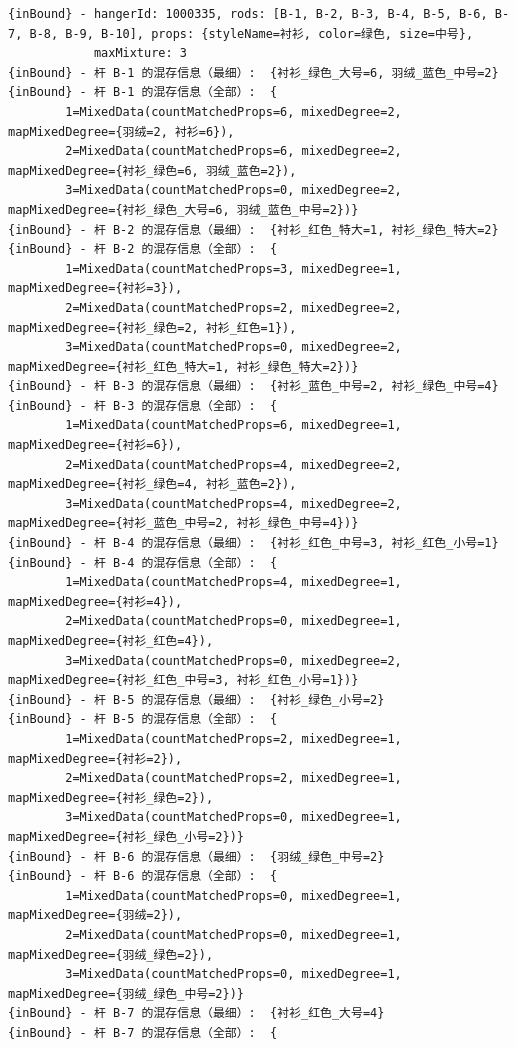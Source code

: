 \begin{enumerate}[leftmargin=32pt,label=\bf{增强\Roman*.}]
\begin{itemize}
		{\scriptsize
		\begin{verbatim}
{inBound} - hangerId: 1000335, rods: [B-1, B-2, B-3, B-4, B-5, B-6, B-7, B-8, B-9, B-10], props: {styleName=衬衫, color=绿色, size=中号}, 
            maxMixture: 3
{inBound} - 杆 B-1 的混存信息（最细）:  {衬衫_绿色_大号=6, 羽绒_蓝色_中号=2}
{inBound} - 杆 B-1 的混存信息（全部）:  {
		1=MixedData(countMatchedProps=6, mixedDegree=2, mapMixedDegree={羽绒=2, 衬衫=6}), 
		2=MixedData(countMatchedProps=6, mixedDegree=2, mapMixedDegree={衬衫_绿色=6, 羽绒_蓝色=2}), 
		3=MixedData(countMatchedProps=0, mixedDegree=2, mapMixedDegree={衬衫_绿色_大号=6, 羽绒_蓝色_中号=2})}
{inBound} - 杆 B-2 的混存信息（最细）:  {衬衫_红色_特大=1, 衬衫_绿色_特大=2}
{inBound} - 杆 B-2 的混存信息（全部）:  {
		1=MixedData(countMatchedProps=3, mixedDegree=1, mapMixedDegree={衬衫=3}), 
		2=MixedData(countMatchedProps=2, mixedDegree=2, mapMixedDegree={衬衫_绿色=2, 衬衫_红色=1}), 
		3=MixedData(countMatchedProps=0, mixedDegree=2, mapMixedDegree={衬衫_红色_特大=1, 衬衫_绿色_特大=2})}
{inBound} - 杆 B-3 的混存信息（最细）:  {衬衫_蓝色_中号=2, 衬衫_绿色_中号=4}
{inBound} - 杆 B-3 的混存信息（全部）:  {
		1=MixedData(countMatchedProps=6, mixedDegree=1, mapMixedDegree={衬衫=6}), 
		2=MixedData(countMatchedProps=4, mixedDegree=2, mapMixedDegree={衬衫_绿色=4, 衬衫_蓝色=2}), 
		3=MixedData(countMatchedProps=4, mixedDegree=2, mapMixedDegree={衬衫_蓝色_中号=2, 衬衫_绿色_中号=4})}
{inBound} - 杆 B-4 的混存信息（最细）:  {衬衫_红色_中号=3, 衬衫_红色_小号=1}
{inBound} - 杆 B-4 的混存信息（全部）:  {
		1=MixedData(countMatchedProps=4, mixedDegree=1, mapMixedDegree={衬衫=4}), 
		2=MixedData(countMatchedProps=0, mixedDegree=1, mapMixedDegree={衬衫_红色=4}), 
		3=MixedData(countMatchedProps=0, mixedDegree=2, mapMixedDegree={衬衫_红色_中号=3, 衬衫_红色_小号=1})}
{inBound} - 杆 B-5 的混存信息（最细）:  {衬衫_绿色_小号=2}
{inBound} - 杆 B-5 的混存信息（全部）:  {
		1=MixedData(countMatchedProps=2, mixedDegree=1, mapMixedDegree={衬衫=2}), 
		2=MixedData(countMatchedProps=2, mixedDegree=1, mapMixedDegree={衬衫_绿色=2}), 
		3=MixedData(countMatchedProps=0, mixedDegree=1, mapMixedDegree={衬衫_绿色_小号=2})}
{inBound} - 杆 B-6 的混存信息（最细）:  {羽绒_绿色_中号=2}
{inBound} - 杆 B-6 的混存信息（全部）:  {
		1=MixedData(countMatchedProps=0, mixedDegree=1, mapMixedDegree={羽绒=2}), 
		2=MixedData(countMatchedProps=0, mixedDegree=1, mapMixedDegree={羽绒_绿色=2}), 
		3=MixedData(countMatchedProps=0, mixedDegree=1, mapMixedDegree={羽绒_绿色_中号=2})}
{inBound} - 杆 B-7 的混存信息（最细）:  {衬衫_红色_大号=4}
{inBound} - 杆 B-7 的混存信息（全部）:  {

\end{verbatim}}
\end{itemize}
\end{enumerate}
